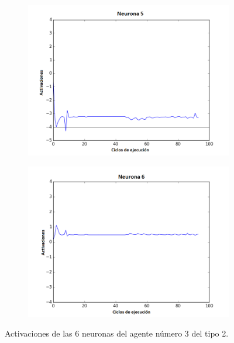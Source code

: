 \begin{figure}[!h]
\begin{subfigure}{0.33\textwidth}
  \includegraphics[width=\linewidth]{Imagenes/Agente2Activaciones/Agente2/Neurona4}
\end{subfigure}\hfil %
\begin{subfigure}{0.33\textwidth}
  \includegraphics[width=\linewidth]{Imagenes/Agente2Activaciones/Agente2/Neurona5}
\end{subfigure}
\caption{Activaciones de las 6 neuronas del agente número 3 del tipo 2.}
\end{figure}

